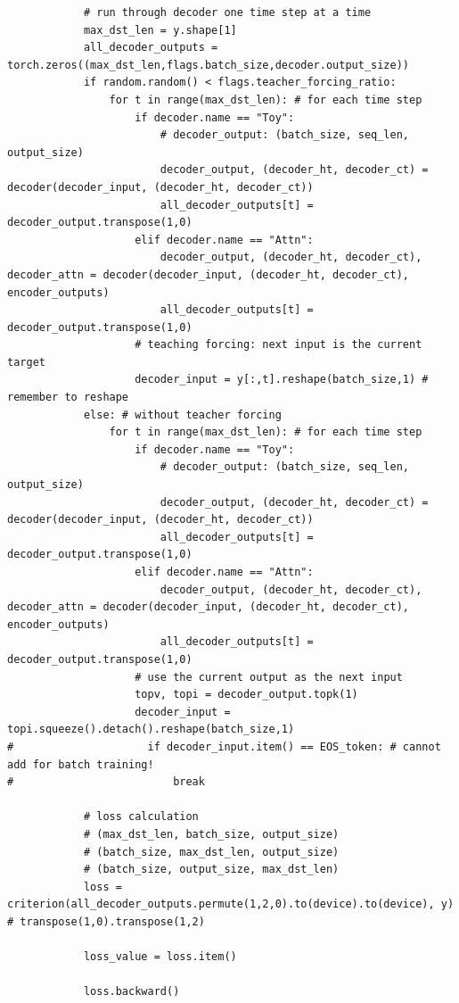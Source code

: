 \documentclass[logo,reportComp]{thesis}
\begin{document}
\begin{lstlisting}
            # run through decoder one time step at a time
            max_dst_len = y.shape[1]
            all_decoder_outputs = torch.zeros((max_dst_len,flags.batch_size,decoder.output_size))
            if random.random() < flags.teacher_forcing_ratio:
                for t in range(max_dst_len): # for each time step
                    if decoder.name == "Toy":
                        # decoder_output: (batch_size, seq_len, output_size)
                        decoder_output, (decoder_ht, decoder_ct) = decoder(decoder_input, (decoder_ht, decoder_ct))
                        all_decoder_outputs[t] = decoder_output.transpose(1,0)
                    elif decoder.name == "Attn":
                        decoder_output, (decoder_ht, decoder_ct), decoder_attn = decoder(decoder_input, (decoder_ht, decoder_ct), encoder_outputs)
                        all_decoder_outputs[t] = decoder_output.transpose(1,0)
                    # teaching forcing: next input is the current target
                    decoder_input = y[:,t].reshape(batch_size,1) # remember to reshape
            else: # without teacher forcing
                for t in range(max_dst_len): # for each time step
                    if decoder.name == "Toy":
                        # decoder_output: (batch_size, seq_len, output_size)
                        decoder_output, (decoder_ht, decoder_ct) = decoder(decoder_input, (decoder_ht, decoder_ct))
                        all_decoder_outputs[t] = decoder_output.transpose(1,0)
                    elif decoder.name == "Attn":
                        decoder_output, (decoder_ht, decoder_ct), decoder_attn = decoder(decoder_input, (decoder_ht, decoder_ct), encoder_outputs)
                        all_decoder_outputs[t] = decoder_output.transpose(1,0)
                    # use the current output as the next input
                    topv, topi = decoder_output.topk(1)
                    decoder_input = topi.squeeze().detach().reshape(batch_size,1)
#                     if decoder_input.item() == EOS_token: # cannot add for batch training!
#                         break

            # loss calculation
            # (max_dst_len, batch_size, output_size)
            # (batch_size, max_dst_len, output_size)
            # (batch_size, output_size, max_dst_len)
            loss = criterion(all_decoder_outputs.permute(1,2,0).to(device).to(device), y) # transpose(1,0).transpose(1,2)

            loss_value = loss.item()

            loss.backward()


\end{lstlisting}
\end{document}
